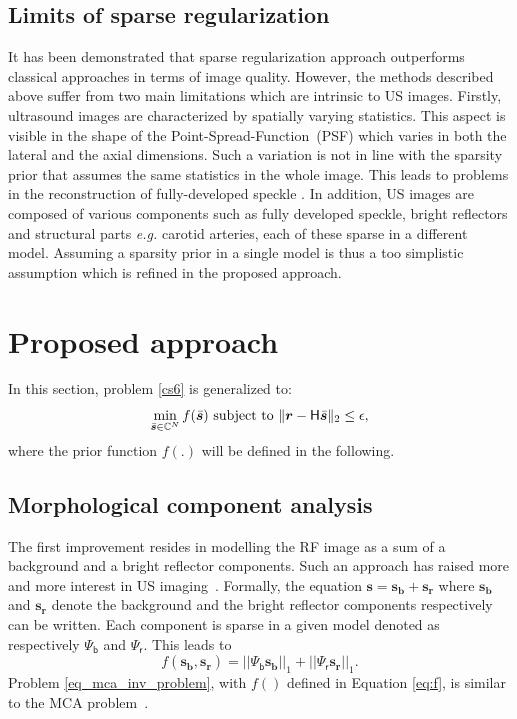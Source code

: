 \documentclass[conference]{IEEEtran}
\begin{document}
\subsection{Limits of sparse regularization}
\label{subsec:limits_sparse_reg}
It has been demonstrated that sparse regularization approach outperforms classical approaches in terms of image quality. However, the methods described above suffer from two main limitations which are intrinsic to US images. Firstly, ultrasound images are characterized by spatially varying statistics. This aspect is visible in the shape of the Point-Spread-Function~(PSF) which varies in both the lateral and the axial dimensions. Such a variation is not in line with the sparsity prior that assumes the same statistics in the whole image. This leads to problems in the reconstruction of fully-developed speckle \cite{Besson_UFFC_2016}.
In addition, US images are composed of various components such as fully developed speckle, bright reflectors and structural parts \textit{e.g.} carotid arteries, each of these sparse in a different model. Assuming a sparsity prior in a single model is thus a too simplistic assumption which is refined in the proposed approach.
\section{Proposed approach}
\label{sec:proposed_approach}
In this section, problem \eqref{cs6} is generalized to:
\begin{equation}
\label{eq_mca_inv_problem}
\min_{\bar{\bm{s}}\in\mathbb{C}^{N}} f(\bar{\bm{s}})
\textnormal{ subject to }\| \bm{r}-\mathsf{H}\bar{\bm{s}}\|_{2}\leq\epsilon,
\end{equation}
where the prior function $f(.)$ will be defined in the following.
\subsection{Morphological component analysis}
\label{subsec:MCA}
The first improvement resides in modelling the RF image as a sum of a background and a bright reflector components. Such an approach has raised more and more interest in US imaging~\cite{BZhang_IUS_2015, Yankelevsky_arxiv_2016, Szasz_Ult_2016}. Formally, the equation $\bm{s} = \bm{s_b} + \bm{s_r}$ where $\bm{s_b}$ and $\bm{s_r}$ denote the background and the bright reflector components respectively can be written.
Each component is sparse in a given model denoted as respectively $\mathsf{\Psi_b}$ and $\mathsf{\Psi_r}$. This leads to 
\begin{equation}
\label{eq:f}
f(\bm{s_b}, \bm{s_r}) = || \mathsf{\Psi_b} \bm{s_b} ||_1 + || \mathsf{\Psi_r} \bm{s_r} ||_1.
\end{equation}
Problem \eqref{eq_mca_inv_problem}, with $f()$ defined in Equation \eqref{eq:f}, is similar to the MCA problem~\cite{Starck2004}.
\end{document}
